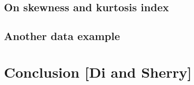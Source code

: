 \documentclass[
  number,
  preprint,
  3p]{elsarticle}
\begin{document}
\hypertarget{on-skewness-and-kurtosis-index}{%
\subsection{On skewness and kurtosis
index}\label{on-skewness-and-kurtosis-index}}

\hypertarget{another-data-example}{%
\subsection{Another data example}\label{another-data-example}}

\hypertarget{sec-conclusion}{%
\section{Conclusion {[}Di and Sherry{]}}\label{sec-conclusion}}


\renewcommand\refname{References}
  
\end{document}
